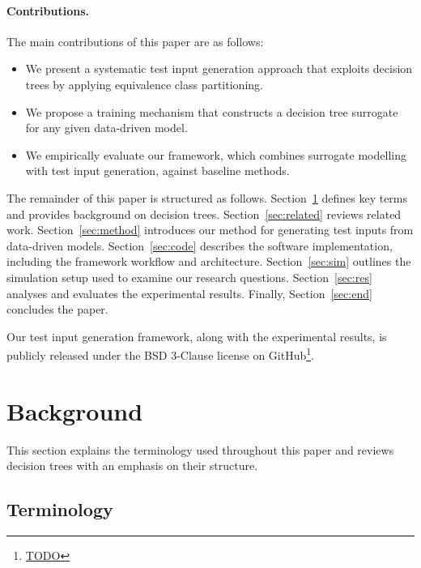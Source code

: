 \documentclass[
]{ceurart}
\theoremstyle{definition}
\begin{document}
\paragraph{Contributions.} The main contributions of this paper are as follows:
\begin{itemize}
\item We present a systematic test input generation approach that exploits decision trees by applying equivalence class partitioning.
\item We propose a training mechanism that constructs a decision tree surrogate for any given data-driven model.
\item We empirically evaluate our framework, which combines surrogate modelling with test input generation, against baseline methods.
 \end{itemize}


The remainder of this paper is structured as follows. Section~\ref{sec:background} defines key terms and provides background on decision trees. Section~\ref{sec:related} reviews related work. Section~\ref{sec:method} introduces our method for generating test inputs from data-driven models. Section~\ref{sec:code} describes the software implementation, including the framework workflow and architecture. Section~\ref{sec:sim} outlines the simulation setup used to examine our research questions. Section~\ref{sec:res} analyses and evaluates the experimental results. Finally, Section~\ref{sec:end} concludes the paper.

Our test input generation framework, along with the experimental results, is publicly released under the BSD 3-Clause license on GitHub\footnote{\url{TODO}}.

\section{Background}
\label{sec:background}

This section explains the terminology used throughout this paper and reviews decision trees with an emphasis on their structure.

\subsection{Terminology}
\end{document}
